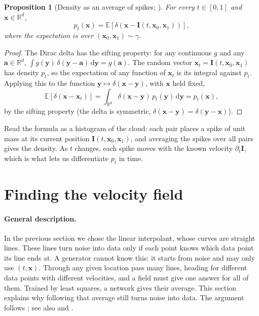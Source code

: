 \documentclass[11pt,a4paper]{article}
\numberwithin{equation}{section}     %
\theoremstyle{plain}        %
\newtheorem{proposition}[theorem]{Proposition}
\theoremstyle{definition}   %
\theoremstyle{remark}       %
\begin{document}
\begin{proposition}[Density as an average of spikes; \citealp{albergo2023stochastic}]\label{prop:deltadensity}
For every $t\in[0,1]$ and $\mathbf{x}\in\mathbb{R}^d$,
\[
p_t(\mathbf{x})=\mathbb{E}\left[\delta\left(\mathbf{x}-\mathbf{I}(t,\mathbf{x}_0,\mathbf{x}_1)\right)\right],
\]
where the expectation is over $(\mathbf{x}_0,\mathbf{x}_1)\sim\gamma$.
\end{proposition}

\begin{proof}
The Dirac delta has the sifting property: for any continuous $g$ and any $\mathbf{a}\in\mathbb{R}^d$, $\int g(\mathbf{y})\,\delta(\mathbf{y}-\mathbf{a})\,\mathrm{d}\mathbf{y}=g(\mathbf{a})$. The random vector $\mathbf{x}_t=\mathbf{I}(t,\mathbf{x}_0,\mathbf{x}_1)$ has density $p_t$, so the expectation of any function of $\mathbf{x}_t$ is its integral against $p_t$. Applying this to the function $\mathbf{y}\mapsto\delta(\mathbf{x}-\mathbf{y})$, with $\mathbf{x}$ held fixed,
\[
\mathbb{E}\left[\delta(\mathbf{x}-\mathbf{x}_t)\right]=\int_{\mathbb{R}^d}\delta(\mathbf{x}-\mathbf{y})\,p_t(\mathbf{y})\,\mathrm{d}\mathbf{y}=p_t(\mathbf{x}),
\]
by the sifting property (the delta is symmetric, $\delta(\mathbf{x}-\mathbf{y})=\delta(\mathbf{y}-\mathbf{x})$).
\end{proof}

Read the formula as a histogram of the cloud: each pair places a spike of unit mass at its current position $\mathbf{I}(t,\mathbf{x}_0,\mathbf{x}_1)$, and averaging the spikes over all pairs gives the density. As $t$ changes, each spike moves with the known velocity $\partial_t\mathbf{I}$, which is what lets us differentiate $p_t$ in time.

\newpage

\section{Finding the velocity field}\label{sec:velocity}

\paragraph{General description.} In the previous section we chose the linear interpolant, whose curves are straight lines. These lines turn noise into data only if each point knows which data point its line ends at. A generator cannot know this: it starts from noise and may only use $(t,\mathbf{x})$. Through any given location pass many lines, heading for different data points with different velocities, and a field must give one answer for all of them. Trained by least squares, a network gives their average. This section explains why following that average still turns noise into data. The argument follows \citet{albergo2023building}; see also \citet{lipman2023} and \citet{liu2023}.
\end{document}
